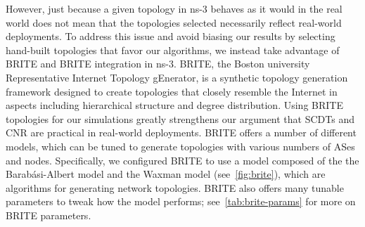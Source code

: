 However, just because a given topology in ns-3 behaves as it would in the real world does not mean that the topologies selected necessarily reflect real-world deployments. To address this issue and avoid biasing our results by selecting hand-built topologies that favor our algorithms, we instead take advantage of BRITE \cite{brite} and BRITE integration in ns-3. BRITE, the Boston university Representative Internet Topology gEnerator, is a synthetic topology generation framework \cite{gtitm, inet} designed to create topologies that closely resemble the Internet in aspects including hierarchical structure and degree distribution. Using BRITE topologies for our simulations greatly strengthens our argument that SCDTs and CNR are practical in real-world deployments. BRITE offers a number of different models, which can be tuned to generate topologies with various numbers of ASes and nodes. Specifically, we configured BRITE to use a model composed of the the Barab{\'a}si-Albert model \cite{BA_model} and the Waxman model \cite{waxman} (see~\autoref{fig:brite}), which are algorithms for generating network topologies. BRITE also offers many tunable parameters to tweak how the model performs; see~\autoref{tab:brite-params} for more on BRITE parameters. 

